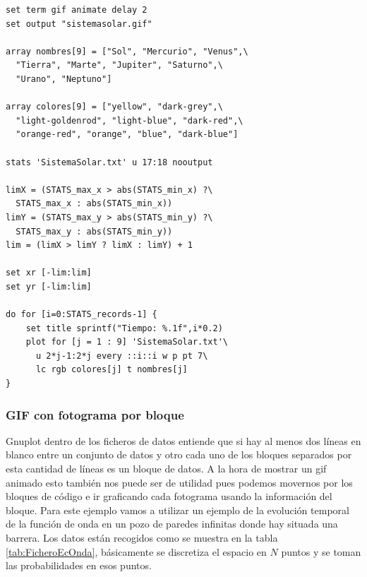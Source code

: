 \documentclass[11pt,a4paper,twoside,pdf]{article}
\numberwithin{equation}{section}
\begin{document}
\begin{lstlisting}[language=Gnuplot]
set term gif animate delay 2
set output "sistemasolar.gif"

array nombres[9] = ["Sol", "Mercurio", "Venus",\
  "Tierra", "Marte", "Jupiter", "Saturno",\
  "Urano", "Neptuno"]

array colores[9] = ["yellow", "dark-grey",\
  "light-goldenrod", "light-blue", "dark-red",\
  "orange-red", "orange", "blue", "dark-blue"]

stats 'SistemaSolar.txt' u 17:18 nooutput

limX = (STATS_max_x > abs(STATS_min_x) ?\
  STATS_max_x : abs(STATS_min_x))
limY = (STATS_max_y > abs(STATS_min_y) ?\
  STATS_max_y : abs(STATS_min_y))
lim = (limX > limY ? limX : limY) + 1

set xr [-lim:lim]
set yr [-lim:lim]

do for [i=0:STATS_records-1] {
    set title sprintf("Tiempo: %.1f",i*0.2)
    plot for [j = 1 : 9] 'SistemaSolar.txt'\
      u 2*j-1:2*j every ::i::i w p pt 7\
      lc rgb colores[j] t nombres[j]
}
\end{lstlisting}

\subsubsection{GIF con fotograma por bloque}

Gnuplot dentro de los ficheros de datos entiende que si hay al menos dos líneas en blanco entre un conjunto de datos y otro cada uno de los bloques separados por esta cantidad de líneas es un bloque de datos. A la hora de mostrar un gif animado esto también nos puede ser de utilidad pues podemos movernos por los bloques de código e ir graficando cada fotograma usando la información del bloque. Para este ejemplo vamos a utilizar un ejemplo de la evolución temporal de la función de onda en un pozo de paredes infinitas donde hay situada una barrera. Los datos están recogidos como se muestra en la tabla \ref{tab:FicheroEcOnda}, básicamente se discretiza el espacio en $N$ puntos y se toman las probabilidades en esos puntos. \\
\end{document}
